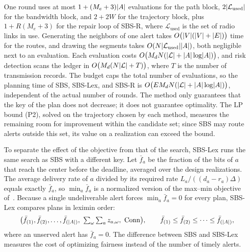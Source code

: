 One round uses at most $1+(M_e+3)\lvert A\rvert$ evaluations for the path block, $2\lvert\mathcal L_{\mathrm{used}}\rvert$ for the bandwidth block, and $2+2W$ for the trajectory block, plus $1+R(M_e+3)$ for the repair loop of SBS-R, where $\mathcal L_{\mathrm{used}}$ is the set of radio links in use. Generating the neighbors of one alert takes $O\bigl(\lvert V\rvert(\lvert V\rvert+\lvert E\rvert)\bigr)$ time for the routes, and drawing the segments takes $O(N\lvert\mathcal L_{\mathrm{used}}\rvert\lvert A\rvert)$, both negligible next to an evaluation. Each evaluation costs $O\bigl(M_dN(\lvert\mathcal L\rvert+\lvert A\rvert\log\lvert A\rvert)\bigr)$, and risk detection scans the ledger in $O\bigl(M_d(N\lvert\mathcal L\rvert+T)\bigr)$, where $T$ is the number of transmission records. The budget caps the total number of evaluations, so the planning time of SBS, SBS-Lex, and SBS-R is $O\bigl(EM_dN(\lvert\mathcal L\rvert+\lvert A\rvert\log\lvert A\rvert)\bigr)$, independent of the actual number of rounds. The method only guarantees that the key of the plan does not decrease; it does not guarantee optimality. The LP bound (P2), solved on the trajectory chosen by each method, measures the remaining room for improvement within the candidate set; since SBS may route alerts outside this set, its value on a realization can exceed the bound.

\label{sec:variants}
To separate the effect of the objective from that of the search, SBS-Lex runs the same search as SBS with a different key. Let $\bar f_a$ be the fraction of the bits of $a$ that reach the center before the deadline, averaged over the design realizations. The average delivery rate of $a$ divided by its required rate $L_a/((d_a-r_a)\Delta)$ equals exactly $\bar f_a$, so $\min_a \bar f_a$ is a normalized version of the max--min objective of~\cite{huang2025ddatsap}. Because a single undeliverable alert forces $\min_a\bar f_a=0$ for every plan, SBS-Lex compares plans in leximin order:
\begin{equation}
\label{eq:leximin}
\bigl(\bar f_{(1)},\bar f_{(2)},\dots,\bar f_{(\abs{A})},\ \textstyle\sum_{\omega}\sum_a z_{a,\omega},\ \mathrm{Conn}\bigr),\qquad \bar f_{(1)}\le\bar f_{(2)}\le\dots\le\bar f_{(\abs{A})},
\end{equation}
\noindent where an unserved alert has $\bar f_a=0$. The difference between SBS and SBS-Lex measures the cost of optimizing fairness instead of the number of timely alerts.
